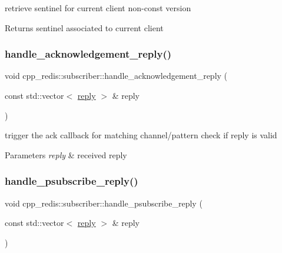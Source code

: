 retrieve sentinel for current client non-\/const version

\begin{DoxyReturn}{Returns}
sentinel associated to current client 
\end{DoxyReturn}
\mbox{\label{classcpp__redis_1_1subscriber_ade918ef2347138492fe213450f27bcfd}} 
\subsubsection{\texorpdfstring{handle\+\_\+acknowledgement\+\_\+reply()}{handle\_acknowledgement\_reply()}}
{\footnotesize\ttfamily void cpp\+\_\+redis\+::subscriber\+::handle\+\_\+acknowledgement\+\_\+reply (\begin{DoxyParamCaption}\item[{const std\+::vector$<$ \hyperlink{classcpp__redis_1_1reply}{reply} $>$ \&}]{reply }\end{DoxyParamCaption})\hspace{0.3cm}{\ttfamily [private]}}

trigger the ack callback for matching channel/pattern check if reply is valid


\begin{DoxyParams}{Parameters}
{\em reply} & received reply \\
\hline
\end{DoxyParams}
\mbox{\label{classcpp__redis_1_1subscriber_a6e67df5af6170ad55e77082f18f63d76}} 
\subsubsection{\texorpdfstring{handle\+\_\+psubscribe\+\_\+reply()}{handle\_psubscribe\_reply()}}
{\footnotesize\ttfamily void cpp\+\_\+redis\+::subscriber\+::handle\+\_\+psubscribe\+\_\+reply (\begin{DoxyParamCaption}\item[{const std\+::vector$<$ \hyperlink{classcpp__redis_1_1reply}{reply} $>$ \&}]{reply }\end{DoxyParamCaption})\hspace{0.3cm}{\ttfamily [private]}}

